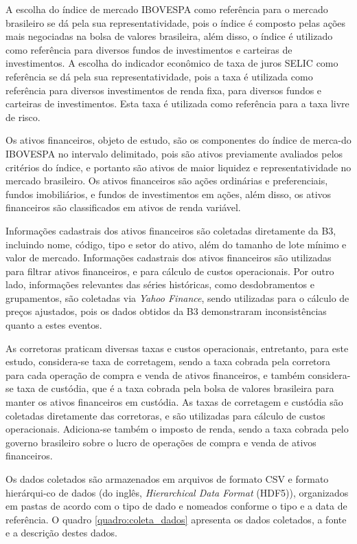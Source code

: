        \ipar A escolha do índice de mercado \acrshort{IBOVESPA} como referência para o mercado brasileiro se dá pela sua representatividade, pois o índice é composto pelas ações mais negociadas na bolsa de valores brasileira, além disso, o índice é utilizado como referência para diversos fundos de investimentos e carteiras de investimentos. A escolha do indicador econômico de taxa de juros SELIC como referência se dá pela sua representatividade, pois a taxa é utilizada como referência para diversos investimentos de renda fixa, para diversos fundos e carteiras de investimentos. Esta taxa é utilizada como referência para a taxa livre de risco.

        \ipar Os ativos financeiros, objeto de estudo, são os componentes do índice de merca-do \acrshort{IBOVESPA} no intervalo delimitado, pois são ativos previamente avaliados pelos critérios do índice, e portanto são ativos de maior liquidez e representatividade no mercado brasileiro. Os ativos financeiros são ações ordinárias e preferenciais, fundos imobiliários, e fundos de investimentos em ações, além disso, os ativos financeiros são classificados em ativos de renda variável.

        \ipar Informações cadastrais dos ativos financeiros são coletadas diretamente da B3, incluindo nome, código, tipo e setor do ativo, além do tamanho de lote mínimo e valor de mercado. Informações cadastrais dos ativos financeiros são utilizadas para filtrar ativos financeiros, e para cálculo de custos operacionais. Por outro lado, informações relevantes das séries históricas, como desdobramentos e grupamentos, são coletadas via \textit{Yahoo Finance}, sendo utilizadas para o cálculo de preços ajustados, pois os dados obtidos da B3 demonstraram inconsistências quanto a estes eventos.

        \ipar As corretoras praticam diversas taxas e custos operacionais, entretanto, para este estudo, considera-se taxa de corretagem, sendo a taxa cobrada pela corretora para cada operação de compra e venda de ativos financeiros, e também considera-se taxa de custódia, que é a taxa cobrada pela bolsa de valores brasileira para manter os ativos financeiros em custódia. As taxas de corretagem e custódia são coletadas diretamente das corretoras, e são utilizadas para cálculo de custos operacionais. Adiciona-se também o imposto de renda, sendo a taxa cobrada pelo governo brasileiro sobre o lucro de operações de compra e venda de ativos financeiros.

        \ipar Os dados coletados são armazenados em arquivos de formato CSV e formato hierárqui-co de dados (do inglês, \textit{Hierarchical Data Format} (HDF5)), organizados em pastas de acordo com o tipo de dado e nomeados conforme o tipo e a data de referência. O quadro \ref{quadro:coleta_dados} apresenta os dados coletados, a fonte e a descrição destes dados.


